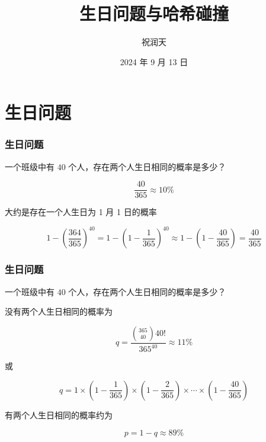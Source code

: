 \documentclass{beamer}
\title{生日问题与哈希碰撞}
\author{祝润天}
\institute{复旦大学计算机科学技术学院}
\date{2024 年 9 月 13 日}
\begin{document}
\begin{frame}
    
    \maketitle

\end{frame}

\section{生日问题}

\begin{frame}
    \frametitle{生日问题}

    \begin{problem}
        一个班级中有 $40$ 个人，存在两个人生日相同的概率是多少？
    \end{problem}

    \pause

    \[\frac{40}{365}\approx 10\%\]

    \begin{center}
        大约是存在一个人生日为 1 月 1 日的概率
    \end{center}

    \[1 - (\frac{364}{365})^{40} = 1 - (1 - \frac{1}{365})^{40} \approx 1 - (1 - \frac{40}{365}) = \frac{40}{365}\]

\end{frame}

\begin{frame}
    \frametitle{生日问题}

    \begin{problem}
        一个班级中有 $40$ 个人，存在两个人生日相同的概率是多少？
    \end{problem}
    
    没有两个人生日相同的概率为

    \[q = \frac{{365 \choose 40} 40!}{365^{40}}\approx 11\%\]

    或

    \[q = 1 \times (1 - \frac{1}{365}) \times (1 - \frac{2}{365}) \times \cdots \times (1 - \frac{40}{365})\]

    有两个人生日相同的概率约为

    \[p = 1 - q \approx 89\%\]

\end{frame}
\end{document}
